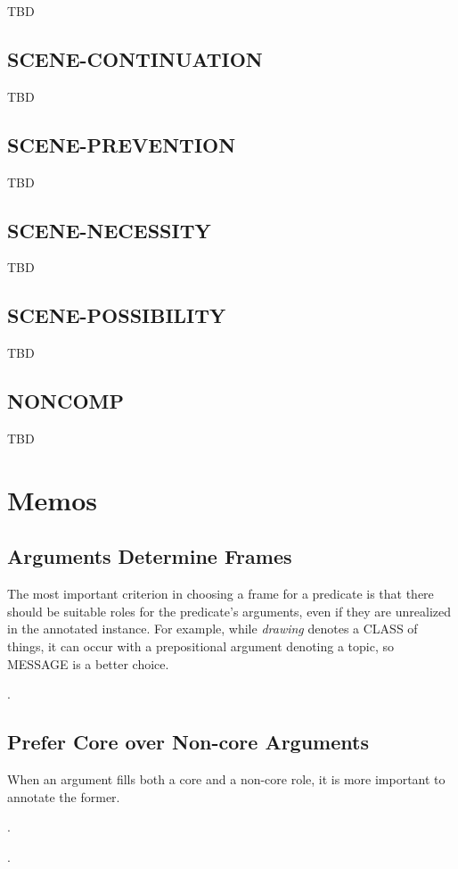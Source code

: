 \documentclass[a4paper]{article}
\newcommand{\fr}[1]{\textsf{#1}}
\newcommand{\rl}[1]{\textsf{#1}}
\begin{document}
TBD

\subsection{\fr{SCENE-CONTINUATION}}
\label{sec:SCENE-CONTINUATION}

TBD

\subsection{\fr{SCENE-PREVENTION}}
\label{sec:SCENE-PREVENTION}

TBD

\subsection{\fr{SCENE-NECESSITY}}
\label{sec:SCENE-NECESSITY}

TBD

\subsection{\fr{SCENE-POSSIBILITY}}
\label{sec:SCENE-POSSIBILITY}

TBD

\subsection{\fr{NONCOMP}}
\label{sec:NONCOMP}

TBD

\section{Memos}

\subsection{Arguments Determine Frames}

The most important criterion in choosing a frame for a predicate is that there
should be suitable roles for the predicate's arguments, even if they are
unrealized in the annotated instance. For example, while \emph{drawing} denotes
a \fr{CLASS} of things, it can occur with a prepositional argument denoting a
\rl{topic}, so \fr{MESSAGE} is a better choice.

\ex.

\subsection{Prefer Core over Non-core Arguments}

When an argument fills both a core and a non-core role, it is more important to
annotate the former.

\ex.

\ex.



\end{document}
